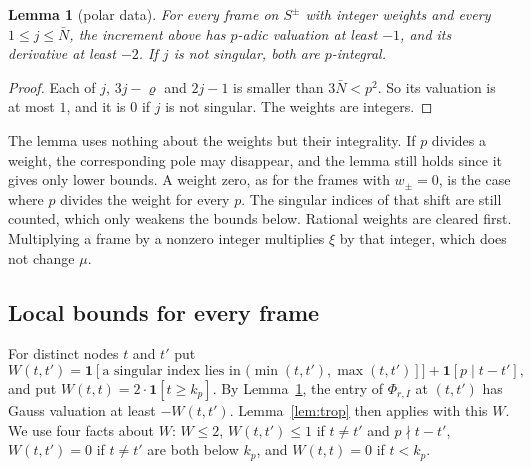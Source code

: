 \documentclass[11pt]{amsart}
\newtheorem{lemma}[theorem]{Lemma}
\theoremstyle{definition}
\theoremstyle{remark}
\numberwithin{equation}{section}
\begin{document}
\begin{lemma}[polar data]\label{lem:poledata}
For every frame on $S^\pm$ with integer weights and every $1\le j\le\bar N$, the increment above has $p$-adic valuation at
least $-1$, and its derivative at least $-2$. If $j$ is not singular, both are $p$-integral.
\end{lemma}
\begin{proof}
Each of $j$, $3j-\varrho$ and $2j-1$ is smaller than $3\bar N<p^2$. So its valuation is at most $1$, and it is $0$ if $j$ is
not singular. The weights are integers.
\end{proof}

The lemma uses nothing about the weights but their integrality. If $p$ divides a weight, the corresponding pole may
disappear, and the lemma still holds since it gives only lower bounds. A weight zero, as for the frames with $w_\pm=0$, is
the case where $p$ divides the weight for every $p$. The singular indices of that shift are still counted, which only
weakens the bounds below. Rational weights are cleared first. Multiplying a
frame by a nonzero integer multiplies $\xi$ by that integer, which does not change $\mu$.

\subsection{Local bounds for every frame}
For distinct nodes $t$ and $t'$ put
\[
 W(t,t')=\mathbf 1[\text{a singular index lies in }(\min(t,t'),\max(t,t')]]+\mathbf 1[p\mid t-t'],
\]
and put $W(t,t)=2\cdot\mathbf 1[t\ge k_p]$. By Lemma~\ref{lem:poledata}, the entry of $\Phi_{r,I}$ at $(t,t')$ has Gauss
valuation at least $-W(t,t')$. Lemma~\ref{lem:trop} then applies with this $W$. We use four facts about $W$: $W\le2$,
$W(t,t')\le1$ if $t\ne t'$ and $p\nmid t-t'$, $W(t,t')=0$ if $t\ne t'$ are both below $k_p$, and $W(t,t)=0$ if
$t<k_p$.
\end{document}
